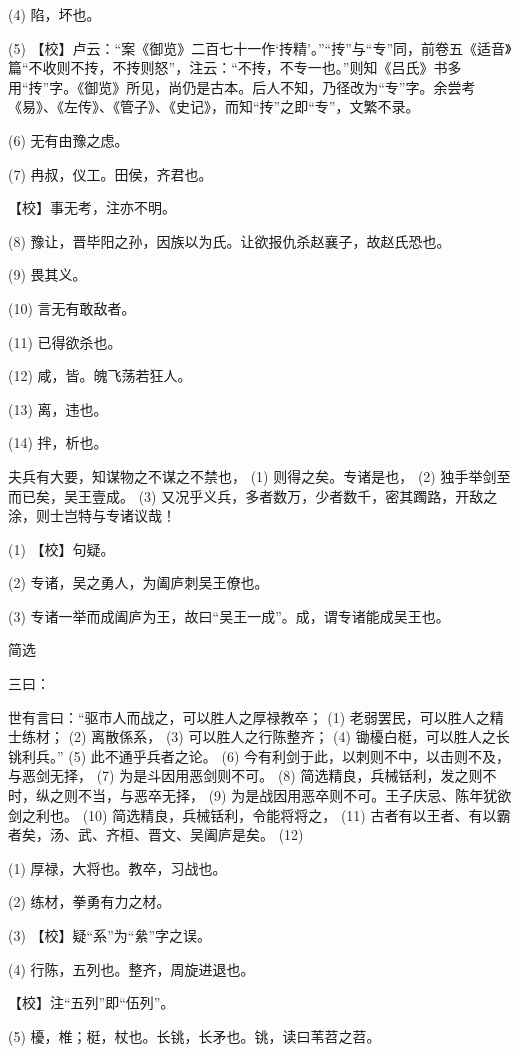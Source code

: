 \documentclass[12pt,UTF8]{ctexbook}
\begin{document}
(4) 陷，坏也。

(5) 【校】卢云：“案《御览》二百七十一作‘抟精’。”“抟”与“专”同，前卷五《适音》篇“不收则不抟，不抟则怒”，注云：“不抟，不专一也。”则知《吕氏》书多用“抟”字。《御览》所见，尚仍是古本。后人不知，乃径改为“专”字。余尝考《易》、《左传》、《管子》、《史记》，而知“抟”之即“专”，文繁不录。

(6) 无有由豫之虑。

(7) 冉叔，仪工。田侯，齐君也。

【校】事无考，注亦不明。

(8) 豫让，晋毕阳之孙，因族以为氏。让欲报仇杀赵襄子，故赵氏恐也。

(9) 畏其义。

(10) 言无有敢敌者。

(11) 已得欲杀也。

(12) 咸，皆。魄飞荡若狂人。

(13) 离，违也。

(14) 拌，析也。

夫兵有大要，知谋物之不谋之不禁也， (1) 则得之矣。专诸是也， (2) 独手举剑至而已矣，吴王壹成。 (3) 又况乎义兵，多者数万，少者数千，密其躅路，开敌之涂，则士岂特与专诸议哉！

(1) 【校】句疑。

(2) 专诸，吴之勇人，为阖庐刺吴王僚也。

(3) 专诸一举而成阖庐为王，故曰“吴王一成”。成，谓专诸能成吴王也。





简选


三曰：

世有言曰：“驱市人而战之，可以胜人之厚禄教卒； (1) 老弱罢民，可以胜人之精士练材； (2) 离散係系， (3) 可以胜人之行陈整齐； (4) 锄櫌白梃，可以胜人之长铫利兵。” (5) 此不通乎兵者之论。 (6) 今有利剑于此，以刺则不中，以击则不及，与恶剑无择， (7) 为是斗因用恶剑则不可。 (8) 简选精良，兵械铦利，发之则不时，纵之则不当，与恶卒无择， (9) 为是战因用恶卒则不可。王子庆忌、陈年犹欲剑之利也。 (10) 简选精良，兵械铦利，令能将将之， (11) 古者有以王者、有以霸者矣，汤、武、齐桓、晋文、吴阖庐是矣。 (12)

(1) 厚禄，大将也。教卒，习战也。

(2) 练材，拳勇有力之材。

(3) 【校】疑“系”为“絫”字之误。

(4) 行陈，五列也。整齐，周旋进退也。

【校】注“五列”即“伍列”。

(5) 櫌，椎；梃，杖也。长铫，长矛也。铫，读曰苇苕之苕。
\end{document}
